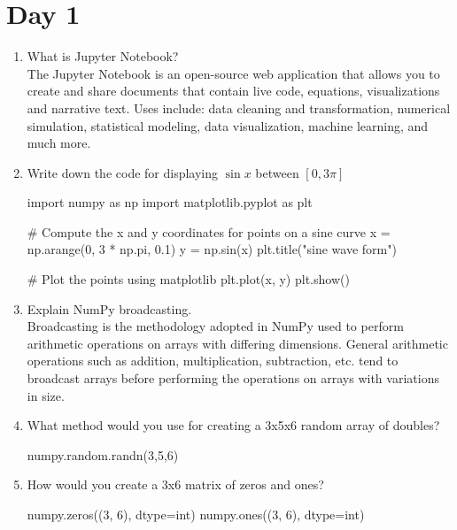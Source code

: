 \documentclass[11pt]{article}
\begin{document}
\section{Day 1}
\begin{enumerate}
\item What is Jupyter Notebook?\\[.5em]
The Jupyter Notebook is an open-source web application that allows you to create and share documents that contain live code, equations, visualizations and narrative text. Uses include: data cleaning and transformation, numerical simulation, statistical modeling, data visualization, machine learning, and much more.

\item Write down the code for displaying $\sin{x}$ between $[0, 3\pi]$\\[.5em]
\begin{python}
import numpy as np 
import matplotlib.pyplot as plt  

# Compute the x and y coordinates for points on a sine curve 
x = np.arange(0, 3 * np.pi, 0.1) 
y = np.sin(x) 
plt.title("sine wave form") 

# Plot the points using matplotlib 
plt.plot(x, y) 
plt.show() 
\end{python}

\item Explain NumPy broadcasting.\\[.5em]
Broadcasting is the methodology adopted in NumPy used to perform arithmetic operations on arrays with differing dimensions. General arithmetic operations such as addition, multiplication, subtraction, etc. tend to broadcast arrays before performing the operations on arrays with variations in size.

\item What method would you use for creating a 3x5x6 random array of doubles?\\[.5em]
\begin{python}
numpy.random.randn(3,5,6)
\end{python}

\item How would you create a 3x6 matrix of zeros and ones?\\[.5em]
\begin{python}
numpy.zeros((3, 6), dtype=int)
numpy.ones((3, 6), dtype=int)
\end{python}
\end{enumerate}
\pagebreak
\end{document}
